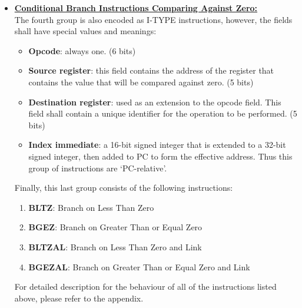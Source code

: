 \documentclass[oneside]{book}
\begin{document}
\begin{itemize}
\item \textbf{\underline{Conditional Branch Instructions
                         Comparing Against Zero:}} \\

The fourth group is also encoded as I-TYPE instructions,
however, the fields shall have special values and meanings:

\begin{itemize}

\item \textbf{Opcode}: always one. (6 bits)

\item \textbf{Source register}: this field contains the address of the
                                register that contains the value
                                that will be compared against zero. (5 bits)

\item \textbf{Destination register}: used as an extension to the opcode field.
                                     This field shall contain a unique
                                     identifier for the operation to be
                                     performed. (5 bits)

\item \textbf{Index immediate}: a 16-bit signed integer that is extended
                                to a 32-bit signed integer, then added
                                to PC to form the effective address. Thus
                                this group of instructions are `PC-relative'.

\end{itemize}

Finally, this last group consists of the following instructions:

\begin{enumerate}

\item \textbf{BLTZ}:   Branch on Less Than Zero
\item \textbf{BGEZ}:   Branch on Greater Than or Equal Zero
\item \textbf{BLTZAL}: Branch on Less Than Zero and Link
\item \textbf{BGEZAL}: Branch on Greater Than or Equal Zero and Link

\end{enumerate}

For detailed description for the behaviour of all of the instructions listed
above, please refer to the appendix.

\end{itemize}
\end{document}
